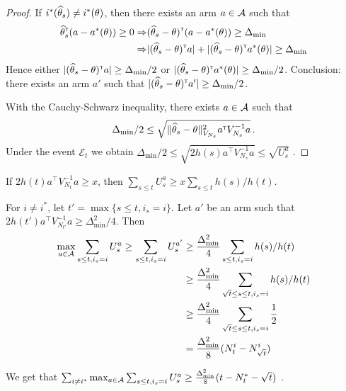 \begin{proof}
If $i^*(\widehat{\theta}_s) \neq i^*(\theta)$, then there exists an arm $a\in\mathcal{A}$ such that
\begin{align*}
\widehat{\theta}_s^{\mathsf{\scriptscriptstyle T}}(a - a^*(\theta)) \ge 0
\Rightarrow & (\widehat{\theta}_s - \theta)^{\mathsf{\scriptscriptstyle T}} (a - a^*(\theta)) \ge \Delta_{\min}
\\
\Rightarrow & | (\widehat{\theta}_s - \theta)^{\mathsf{\scriptscriptstyle T}} a | + | (\widehat{\theta}_s - \theta)^{\mathsf{\scriptscriptstyle T}} a^*(\theta) | \ge \Delta_{\min}
\end{align*}
Hence either $| (\widehat{\theta}_s - \theta)^{\mathsf{\scriptscriptstyle T}} a | \ge \Delta_{\min}/2$ or $| (\widehat{\theta}_s - \theta)^{\mathsf{\scriptscriptstyle T}} a^*(\theta) | \ge \Delta_{\min}/2$. Conclusion: there exists an arm $a'$ such that $| (\widehat{\theta}_s - \theta)^{\mathsf{\scriptscriptstyle T}} a' | \ge \Delta_{\min}/2$.

With the Cauchy-Schwarz inequality, there exists $a\in\mathcal{A}$ such that
\[
    \Delta_{\min}/2 \le \sqrt{\Vert \widehat{\theta}_s - \theta \Vert^2_{V_{N_s}} a^{\mathsf{\scriptscriptstyle T}} V_{N_s}^{-1}a}\,.
\]
Under the event $\mathcal E_t$ we obtain $\Delta_{\min}/2 \le \sqrt{2 h(s) a^\top V_{N_s}^{-1}a} \le \sqrt{U_s^a}$ .
\end{proof}

\begin{lemma}
If $2h(t)a^\top V_{N_t}^{-1}a \ge x$, then $\sum_{s\le t} U_s^a \ge x \sum_{s\le t} h(s)/h(t)$.
\end{lemma}

For $i\neq i^*$, let $t'= \max\{s\le t, i_s = i\}$. Let $a'$ be an arm such that $2h(t')a^\top V_{N_{t'}}^{-1}a \ge \Delta_{\min}^2/4$. Then
\begin{align*}
\max_{a\in \mathcal{A}}\sum_{s\le t, i_s=i} U_s^a
\ge \sum_{s\le t, i_s=i} U_s^{a'}
&\ge \frac{\Delta_{\min}^2}{4} \sum_{s\le t, i_s=i} h(s)/h(t)
\\
&\ge \frac{\Delta_{\min}^2}{4} \sum_{\sqrt{t} \le s\le t, i_s=i} h(s)/h(t)
\\
&\ge \frac{\Delta_{\min}^2}{4} \sum_{\sqrt{t} \le s\le t, i_s=i} \frac{1}{2}
\\
&= \frac{\Delta_{\min}^2}{8} (N_t^i - N_{\sqrt{t}}^i)
\end{align*}

We get that $\sum_{i\neq i^*}\max_{a\in \mathcal{A}}\sum_{s\le t, i_s=i} U_s^a \ge \frac{\Delta_{\min}^2}{8} (t - N_t^* - \sqrt{t})$ .

